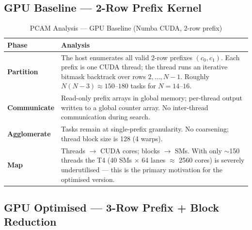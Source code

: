 \documentclass[12pt, letterpaper]{article}
\begin{document}
\subsection{GPU Baseline --- 2-Row Prefix Kernel}

\begin{table}[H]
\centering
\caption{PCAM Analysis --- GPU Baseline (Numba CUDA, 2-row prefix)}
\begin{tabular}{@{}p{3cm}p{10cm}@{}}
\toprule
\textbf{Phase} & \textbf{Analysis} \\
\midrule
\textbf{Partition} & The host enumerates all valid 2-row prefixes $(c_0, c_1)$. Each prefix is one CUDA thread; the thread runs an iterative bitmask backtrack over rows $2, \ldots, N-1$. Roughly $N(N-3) \approx 150$--$180$ tasks for $N = 14$--$16$. \\
\textbf{Communicate} & Read-only prefix arrays in global memory; per-thread output written to a global counter array. No inter-thread communication during search. \\
\textbf{Agglomerate} & Tasks remain at single-prefix granularity. No coarsening; thread block size is 128 (4 warps). \\
\textbf{Map} & Threads $\to$ CUDA cores; blocks $\to$ SMs. With only $\sim$150 threads the T4 (40 SMs $\times$ 64 lanes $\approx$ 2560 cores) is severely underutilised --- this is the primary motivation for the optimised version. \\
\bottomrule
\end{tabular}
\label{tab:pcam_gpu_baseline}
\end{table}

\subsection{GPU Optimised --- 3-Row Prefix + Block Reduction}
\end{document}
